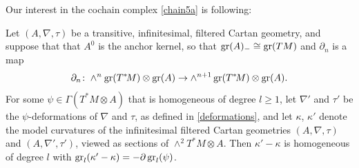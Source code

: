 \documentclass[leqno,12pt]{amsart} %
\begin{document}
Our interest in the cochain complex \eqref{chain5a} is following:
\begin{proposition}
  Let $(A, \nabla, \tau)$ be a transitive, infinitesimal, filtered Cartan geometry, and
  suppose that that $A^0$ is the anchor kernel, so that $\operatorname{\operatorname{gr}}(A)_{-} \cong \operatorname{\operatorname{gr}}(TM)$
  and $\partial_n$ is a map
  $$\partial_n \colon\wedge^n \operatorname{\operatorname{gr}}(T^*\!M) \otimes \operatorname{\operatorname{gr}}(A)\rightarrow
  \wedge^{n+1} \operatorname{\operatorname{gr}}(T^*\!M) \otimes \operatorname{\operatorname{gr}}(A).$$ For some
  $\psi \in \Gamma(T^*\!M \otimes A)$ that is homogeneous of degree $l \ge 1$, let
  $\nabla'$ and $\tau'$ be the $\psi$-deformations of $\nabla $ and $\tau $, as defined in
  \ref{deformations}, and let $\kappa $, $\kappa'$ denote the model curvatures of the
  infinitesimal filtered Cartan geometries $(A, \nabla, \tau)$ and $(A, \nabla', \tau')$,
  viewed as sections of $\wedge^2 T^*\!M \otimes A$. Then $\kappa' - \kappa $ is
  homogeneous of degree $l$ with
  $\operatorname{\operatorname{gr}}_l(\kappa' - \kappa) = -\partial \operatorname{\operatorname{gr}}_l(\psi)$.
\end{proposition}
\end{document}

